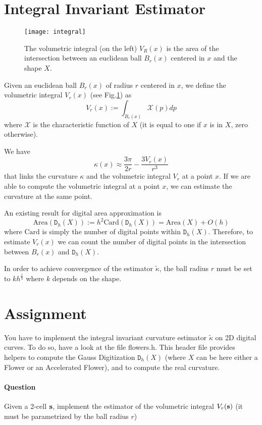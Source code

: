 \documentclass[a4paper, 11pt]{article}
\begin{document}
\section*{Integral Invariant Estimator}

\begin{figure}
  \centering
  \texttt{[image: integral]}
  \caption{The volumetric integral (on the left) $V_R(x)$ is the area of the intersection between an euclidean ball $B_r(x)$ centered in $x$ and the shape $X$.}
  \label{fig:integral}
\end{figure}

Given an euclidean ball $B_r(x)$ of radius $r$ centered in $x$, we define the volumetric integral $V_r(x)$ (see Fig.\ref{fig:integral}) as
\[
  V_r(x) := \int_{B_r(x)} \mathcal{X}(p)dp
\]
where $\mathcal{X}$ is the characteristic function of $X$ (it is equal to one if $x$ is in $X$, zero otherwise).

We have
\[
  \kappa(x) \approx \frac{3 \pi}{2r} - \frac{3 V_r(x)}{r^3}
\]
that links the curvature $\kappa$ and the volumetric integral $V_r$ at a point $x$. If we are able to compute the volumetric integral at a point $x$,
we can estimate the curvature at the same point.

An existing result for digital area approximation is
\[
  \text{Area}( \mathtt{D}_h(X) ) := h^2 \text{Card}(\mathtt{D}_h(X)) = \text{Area}(X) + O(h)
\]
where $\text{Card}$ is simply the number of digital points within $\mathtt{D}_h(X)$. Therefore, to estimate $V_r(x)$ we can count the number of digital points in the intersection
between $B_r(x)$ and $\mathtt{D}_h(X)$.

In order to achieve convergence of the estimator $\tilde{\kappa}$, the ball radius $r$ must be set to $k h^{\frac{1}{3}}$ where $k$ depends on the shape.

\section*{Assignment}

You have to implement the integral invariant curvature estimator $\tilde{\kappa}$ on 2D digital curves. To do so, have a look at the file flowers.h.
This header file provides helpers to compute the Gauss Digitization $\mathtt{D}_h(X)$ (where $X$ can be here either a Flower or an Accelerated Flower), and to compute the real curvature.

\paragraph{Question} Given a 2-cell $\bf{s}$, implement the estimator of the volumetric integral $V_r(\bf{s})$ (it must be parametrized by the ball radius $r$)
\end{document}
